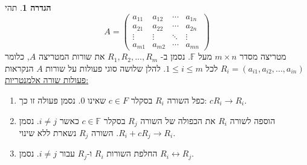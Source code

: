\documentclass[12pt]{report}
\theoremstyle{plain}
\theoremstyle{definition}
\newtheorem{definition}[theorem]{הגדרה}
\newcommand{\F}{\mathbb{F}}
\newcommand{\0}{\mathbf{0}}
\begin{document}
\begin{definition}
תהי
$$
A=\begin{pmatrix}a_{11} & a_{12} & \cdots & a_{1n}\\
a_{21} & a_{22} & \cdots & a_{2n}\\
\vdots & \vdots & \ddots & \vdots\\
a_{m1} & a_{m2} & \cdots & a_{mn}
\end{pmatrix}
$$
מטריצה מסדר
$m\times n$
מעל $\F$.
נסמן ב-
$R_1,R_2,...,R_m$
את שורות המטריצה
$A$,
כלומר
$R_{i}=(a_{i1},a_{i2},...,a_{in})$
לכל
$1\leq i\leq m$.
להלן שלושה סוגי פעולות על שורות
$A$ הנקראות
\underline{פעולות שורה
אלמנטריות:}

\begin{enumerate}[label=\alph*.]
\item
 כפל השורה
 $R_{i}$
 בסקלר
 $c\in F$
 שאינו
$0$.
נסמן פעולה זו כך:
$cR_{i}\rightarrow R_{i}$.

\item
 הוספה לשורה
 $R_{i}$
 את הכפולה של השורה $R_{j}$
בסקלר
$c\in \F$
כאשר $i\neq j$.
נסמן $R_{i}+cR_{j}\rightarrow R_{i}$.
השורה
$R_{j}$
נשארת ללא שינוי.

\item
החלפת השורות $R_{i}$ ו-$R_{j}$ עבור $i\neq j$.
נסמן $R_{i}\leftrightarrow R_{j}$.
\end{enumerate}
\end{definition}
\end{document}
